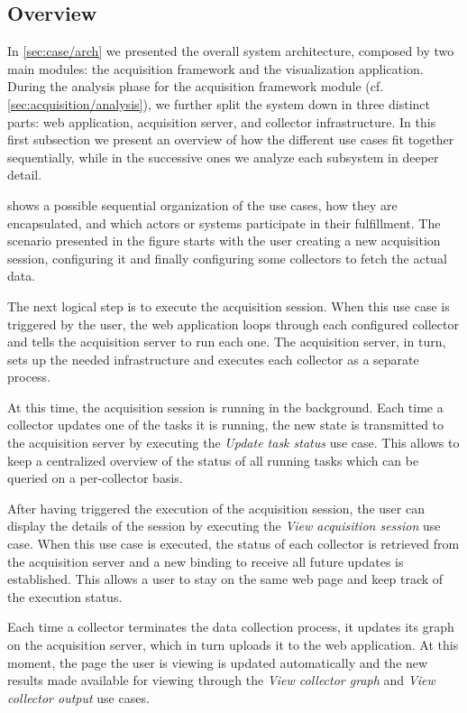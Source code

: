 \subsection{Overview}

In \vref{sec:case/arch} we presented the overall system architecture, composed by two main modules: the acquisition framework and the visualization application. During the analysis phase for the acquisition framework module (cf. \ref{sec:acquisition/analysis}), we further split the system down in three distinct parts: web application, acquisition server, and collector infrastructure. In this first subsection we present an overview of how the different use cases fit together sequentially, while in the successive ones we analyze each subsystem in deeper detail.

 shows a possible sequential organization of the use cases, how they are encapsulated, and which actors or systems participate in their fulfillment. The scenario presented in the figure starts with the user creating a new acquisition session, configuring it and finally configuring some collectors to fetch the actual data.

The next logical step is to execute the acquisition session. When this use case is triggered by the user, the web application loops through each configured collector and tells the acquisition server to run each one. The acquisition server, in turn, sets up the needed infrastructure and executes each collector as a separate process.

At this time, the acquisition session is running in the background. Each time a collector updates one of the tasks it is running, the new state is transmitted to the acquisition server by executing the \emph{Update task status} use case. This allows to keep a centralized overview of the status of all running tasks which can be queried on a per-collector basis.

After having triggered the execution of the acquisition session, the user can display the details of the session by executing the \emph{View acquisition session} use case. When this use case is executed, the status of each collector is retrieved from the acquisition server and a new binding to receive all future updates is established. This allows a user to stay on the same web page and keep track of the execution status.

Each time a collector terminates the data collection process, it updates its graph on the acquisition server, which in turn uploads it to the web application. At this moment, the page the user is viewing is updated automatically and the new results made available for viewing through the \emph{View collector graph} and \emph{View collector output} use cases.

